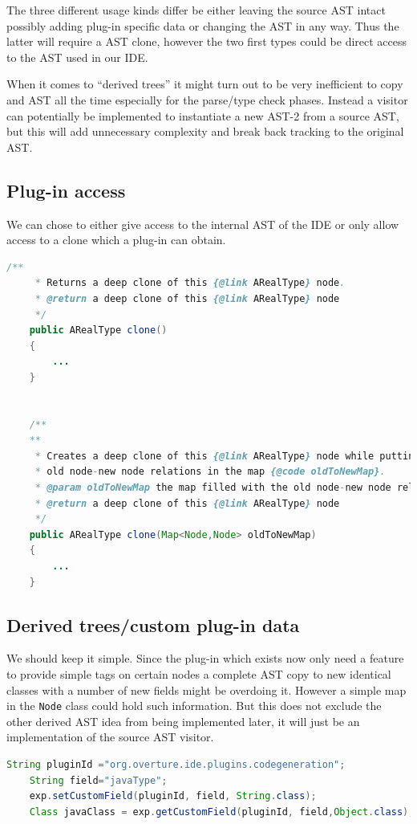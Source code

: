 \documentclass{overturerep}
\begin{document}
The three different usage kinds differ be either leaving the source AST intact possibly adding plug-in specific data or changing the AST in any way. Thus the latter will require a AST clone, however the two first types could be direct access to the AST used in our IDE.

When it comes to ``derived trees'' it might turn out to be very inefficient to copy and AST all the time especially for the parse/type check phases. Instead a visitor can potentially be implemented to instantiate a new AST-2 from a source AST, but this will add unnecessary complexity and break back tracking to the original AST.

\subsection{Plug-in access}
We can chose to either give access to the internal AST of the IDE or only allow access to a clone which a plug-in can obtain.

\begin{lstlisting}[language=java]
	/**
	 * Returns a deep clone of this {@link ARealType} node.
	 * @return a deep clone of this {@link ARealType} node
	 */
	public ARealType clone()
	{
		...
	}


	/**
	**
	 * Creates a deep clone of this {@link ARealType} node while putting all
	 * old node-new node relations in the map {@code oldToNewMap}.
	 * @param oldToNewMap the map filled with the old node-new node relation
	 * @return a deep clone of this {@link ARealType} node
	 */
	public ARealType clone(Map<Node,Node> oldToNewMap)
	{
		...
	}
\end{lstlisting}

\subsection{Derived trees/custom plug-in data}
We should keep it simple. Since the plug-in which exists now only need a feature to provide simple tags on certain nodes a complete AST copy to new identical classes with a number of new fields might be overdoing it. However a simple map in the \texttt{Node} class could hold such information. But this does not exclude the other derived AST idea from being implemented later, it will just be an implementation of the source AST visitor.

\begin{lstlisting}[language=java]
	String pluginId ="org.overture.ide.plugins.codegeneration";
	String field="javaType";
	exp.setCustomField(pluginId, field, String.class);
	Class javaClass = exp.getCustomField(pluginId, field,Object.class);
\end{lstlisting}
\end{document}
